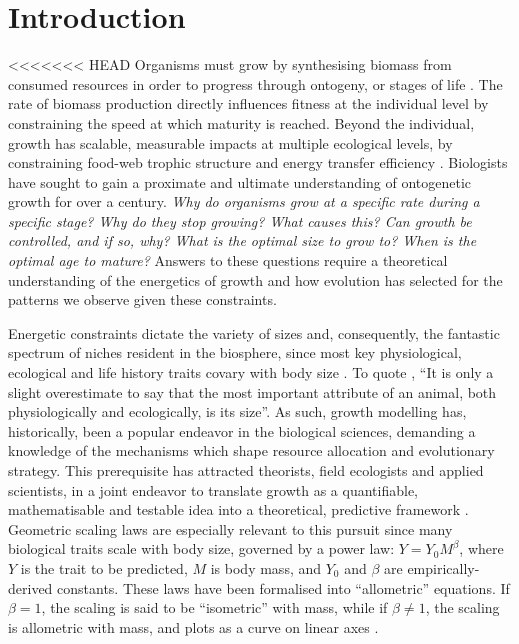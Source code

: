 \documentclass[a4paper]{article} %
\begin{document}
\section{Introduction}\thispagestyle{plain}
<<<<<<< HEAD
    Organisms must grow by synthesising biomass from consumed resources in order to progress through ontogeny, or stages of life \autocite{Hariharan2016}. The rate of biomass production directly influences fitness at the individual level by constraining the speed at which maturity is reached. Beyond the individual, growth has scalable, measurable impacts at multiple ecological levels, by constraining food-web trophic structure and energy transfer efficiency \autocite{Barneche2018}. Biologists have sought to gain a proximate and ultimate understanding of ontogenetic growth for over a century. \textit{Why do organisms grow at a specific rate during a specific stage? Why do they stop growing? What causes this? Can growth be controlled, and if so, why? What is the optimal size to grow to? When is the optimal age to mature?} Answers to these questions require a theoretical understanding of the energetics of growth and how evolution has selected for the patterns we observe given these constraints. 
    
    Energetic constraints dictate the variety of sizes and, consequently, the fantastic spectrum of niches resident in the biosphere, since most key physiological, ecological and life history traits covary with body size \autocite{peters1983, brown2000-scaling-book,schmidt1984scaling,Marshall2019b}. To quote \textcite{Bartholomew1981}, ``It is only a slight overestimate to say that the most important attribute of an animal, both physiologically and ecologically, is its size''. As such, growth modelling has, historically, been a popular endeavor in the biological sciences, demanding a knowledge of the mechanisms which shape resource allocation and evolutionary strategy. This prerequisite has attracted theorists, field ecologists and applied scientists, in a joint endeavor to translate growth as a quantifiable, mathematisable and testable idea into a theoretical, predictive framework \autocite{popper1962,popper1972,peters1983, West2011}. Geometric scaling laws are especially relevant to this pursuit since many biological traits scale with body size, governed by a power law: $Y = Y_0 M^{\beta}$, where $Y$ is the trait to be predicted, $M$ is body mass, and $Y_0$ and $\beta$ are empirically-derived constants. These laws have been formalised into ``allometric'' equations. If $\beta = 1$, the scaling is said to be ``isometric'' with mass, while if $\beta \neq 1$, the scaling is allometric with mass, and plots as a curve on linear axes \autocite{brown2000-scaling-book}.
\end{document}
